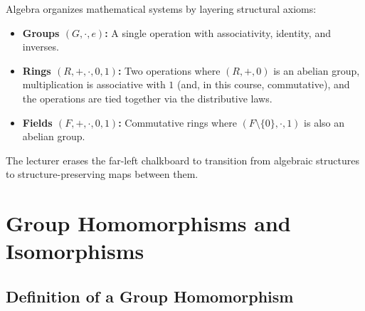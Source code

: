 \begin{insight}
Algebra organizes mathematical systems by layering structural axioms:
\begin{itemize}
    \item \textbf{Groups $(G, \cdot, e)$:} A single operation with associativity, identity, and inverses.
    \item \textbf{Rings $(R, +, \cdot, 0, 1)$:} Two operations where $(R, +, 0)$ is an abelian group, multiplication is associative with $1$ (and, in this course, commutative), and the operations are tied together via the distributive laws.
    \item \textbf{Fields $(F, +, \cdot, 0, 1)$:} Commutative rings where $(F \setminus \{0\}, \cdot, 1)$ is also an abelian group.
\end{itemize}
\end{insight}

\begin{hidden}
\end{hidden}

\begin{note}
The lecturer erases the far-left chalkboard to transition from algebraic structures to structure-preserving maps between them.
\end{note}

\section{Group Homomorphisms and Isomorphisms}

\subsection{Definition of a Group Homomorphism}

